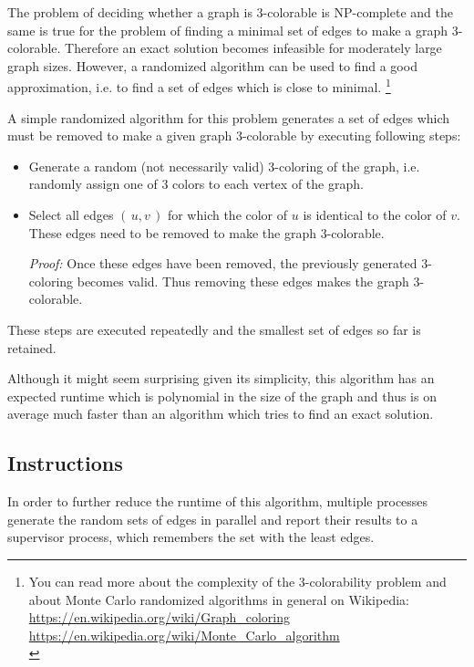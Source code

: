 The problem of deciding whether a graph is 3-colorable is NP-complete
and the same is true for the problem of finding a minimal set of edges
to make a graph 3-colorable.
Therefore an exact solution becomes infeasible for moderately large graph sizes.
However, a randomized algorithm can be used to find a good approximation,
i.e. to find a set of edges which is close to minimal.
\footnote{
You can read more about the complexity of the 3-colorability problem
and about Monte Carlo randomized algorithms in general on Wikipedia:\\
\url{https://en.wikipedia.org/wiki/Graph_coloring}\\
\url{https://en.wikipedia.org/wiki/Monte_Carlo_algorithm}\\
}

A simple randomized algorithm for this problem generates a set of edges
which must be removed to make a given graph 3-colorable
by executing following steps:

\begin{itemize}
\item Generate a random (not necessarily valid) 3-coloring of the graph,
i.e. randomly assign one of 3 colors to each vertex of the graph.

\item Select all edges $(\,u,v\,)$ for which
the color of $u$ is identical to the color of $v$.
These edges need to be removed to make the graph 3-colorable.

\emph{Proof:}
Once these edges have been removed,
the previously generated 3-coloring becomes valid.
Thus removing these edges makes the graph 3-colorable.
\end{itemize}

These steps are executed repeatedly and the smallest set of edges so far is retained.

Although it might seem surprising given its simplicity,
this algorithm has an expected runtime which is polynomial in the size of the graph
and thus is on average much faster than an algorithm which tries to find an exact solution.

\clearpage
\subsection*{Instructions}

In order to further reduce the runtime of this algorithm,
multiple processes generate the random sets of edges in parallel
and report their results to a supervisor process,
which remembers the set with the least edges.

